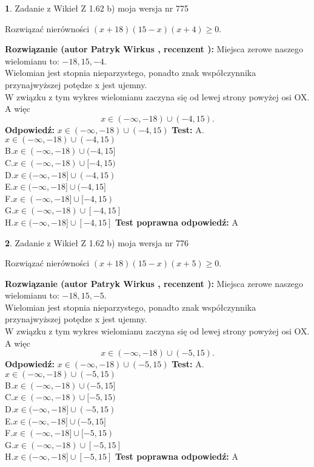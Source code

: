 \documentclass[12pt, a4paper]{article}
\theoremstyle{definition} %
\newtheorem{zad}{}
\newcommand{\zadStart}[1]{\begin{zad}#1\newline}
\newcommand{\zadStop}{\end{zad}}
\newcommand{\rozwStart}[2]{\noindent \textbf{Rozwiązanie (autor #1 , recenzent #2): }\newline}
\newcommand{\rozwStop}{\newline}
\newcommand{\odpStart}{\noindent \textbf{Odpowiedź:}\newline}
\newcommand{\odpStop}{\newline}
\newcommand{\testStart}{\noindent \textbf{Test:}\newline}
\newcommand{\testStop}{\newline}
\newcommand{\kluczStart}{\noindent \textbf{Test poprawna odpowiedź:}\newline}
\newcommand{\kluczStop}{\newline}
\begin{document}
\zadStart{Zadanie z Wikieł Z 1.62 b) moja wersja nr 775}

Rozwiązać nierówności $(x+18)(15-x)(x+4)\ge0$.
\zadStop
\rozwStart{Patryk Wirkus}{}
Miejsca zerowe naszego wielomianu to: $-18, 15, -4$.\\
Wielomian jest stopnia nieparzystego, ponadto znak współczynnika przy\linebreak najwyższej potędze x jest ujemny.\\ W związku z tym wykres wielomianu zaczyna się od lewej strony powyżej osi OX. A więc $$x \in (-\infty,-18) \cup (-4,15).$$
\rozwStop
\odpStart
$x \in (-\infty,-18) \cup (-4,15)$
\odpStop
\testStart
A.$x \in (-\infty,-18) \cup (-4,15)$\\
B.$x \in (-\infty,-18) \cup (-4,15]$\\
C.$x \in (-\infty,-18) \cup [-4,15)$\\
D.$x \in (-\infty,-18] \cup (-4,15)$\\
E.$x \in (-\infty,-18] \cup (-4,15]$\\
F.$x \in (-\infty,-18] \cup [-4,15)$\\
G.$x \in (-\infty,-18) \cup [-4,15]$\\
H.$x \in (-\infty,-18] \cup [-4,15]$
\testStop
\kluczStart
A
\kluczStop



\zadStart{Zadanie z Wikieł Z 1.62 b) moja wersja nr 776}

Rozwiązać nierówności $(x+18)(15-x)(x+5)\ge0$.
\zadStop
\rozwStart{Patryk Wirkus}{}
Miejsca zerowe naszego wielomianu to: $-18, 15, -5$.\\
Wielomian jest stopnia nieparzystego, ponadto znak współczynnika przy\linebreak najwyższej potędze x jest ujemny.\\ W związku z tym wykres wielomianu zaczyna się od lewej strony powyżej osi OX. A więc $$x \in (-\infty,-18) \cup (-5,15).$$
\rozwStop
\odpStart
$x \in (-\infty,-18) \cup (-5,15)$
\odpStop
\testStart
A.$x \in (-\infty,-18) \cup (-5,15)$\\
B.$x \in (-\infty,-18) \cup (-5,15]$\\
C.$x \in (-\infty,-18) \cup [-5,15)$\\
D.$x \in (-\infty,-18] \cup (-5,15)$\\
E.$x \in (-\infty,-18] \cup (-5,15]$\\
F.$x \in (-\infty,-18] \cup [-5,15)$\\
G.$x \in (-\infty,-18) \cup [-5,15]$\\
H.$x \in (-\infty,-18] \cup [-5,15]$
\testStop
\kluczStart
A
\kluczStop
\end{document}
